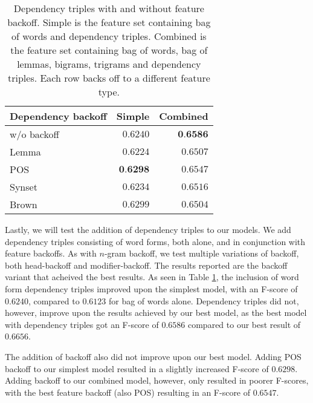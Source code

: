 \documentclass[11pt,letterpaper]{article}
\begin{document}
\begin{table}
  \begin{smaller}    
  \begin{center}
    \begin{tabular}{lrr}
      \toprule           
      Dependency backoff & Simple & Combined\\
      \midrule
      w/o backoff & $0.6240$ & $\textbf{0.6586}$ \\
      Lemma & $0.6224$ & $0.6507$ \\
      POS & $\textbf{0.6298}$ & $0.6547$ \\ %
      Synset & $0.6234$ & $0.6516$  \\ %
      Brown & $0.6299$ & $0.6504$ \\ %
      \bottomrule
    \end{tabular}
  \end{center}
  \caption{Dependency triples with and without feature backoff. Simple is the feature set containing bag of words and dependency triples. Combined is the feature set containing bag of words, bag of lemmas, bigrams, trigrams and dependency triples. Each row backs off to a different feature type.}
  \label{tab:depbackoff}
  \end{smaller}
\end{table}

Lastly, we will test the addition of dependency triples to our models. We add dependency triples consisting of word forms, both alone, and in conjunction with feature backoffs. As with $n$-gram backoff, we test multiple variations of backoff, both head-backoff and modifier-backoff. The results reported are the backoff variant that acheived the best results. As seen in Table \ref{tab:depbackoff}, the inclusion of word form dependency triples improved upon the simplest model, with an F-score of $0.6240$, compared to $0.6123$ for bag of words alone. Dependency triples did not, however, improve upon the results achieved by our best model, as the best model with dependency triples got an F-score of $0.6586$ compared to our best result of $0.6656$.

The addition of backoff also did not improve upon our best model. Adding POS backoff to our simplest model resulted in a slightly increased F-score of $0.6298$. Adding backoff to our combined model, however, only resulted in poorer F-scores, with the best feature backoff (also POS) resulting in an F-score of $0.6547$.
\end{document}
